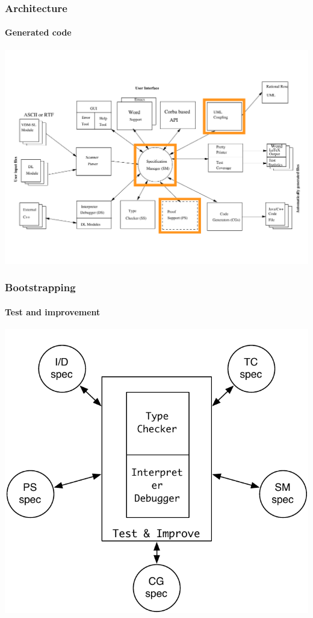 \documentclass[slidestop,uncompress,mathserif,final]{beamer}
\newcommand{\pgl}[0]{Peter Gorm Larsen}
\begin{document}
\begin{frame}[c]
  \frametitle{Architecture}
  \framesubtitle{Generated code}

  \begin{center}
    \includegraphics[width=\textwidth]{images/vdmtools_arch_cg.pdf}
  \end{center}
\end{frame}


\begin{frame}[c]
  \frametitle{Bootstrapping}
  \framesubtitle{Test and improvement}
 
  \begin{center}
    \includegraphics[width=.6\textwidth]{images/test_improve.pdf}
  \end{center}
\end{frame}
\end{document}
